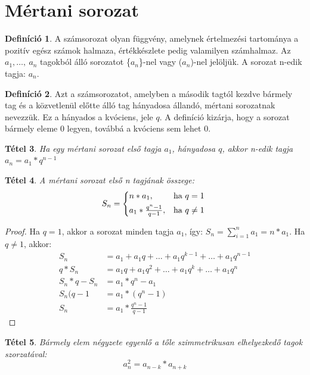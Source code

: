\documentclass[twoside,12pt]{report}
\newtheorem{theorem}{Tétel}[section]
\theoremstyle{definition}
\newtheorem{definition}[theorem]{Definíció}
\begin{document}
\section{Mértani sorozat}
	\begin{definition}
		A számsorozat olyan függvény, amelynek értelmezési tartománya a pozitív egész számok
		halmaza, értékkészlete pedig valamilyen számhalmaz. Az $a_1,\dots,\ a_n$ tagokból álló sorozatot \{$a_n$\}-nel vagy ($a_n$)-nel jelöljük. A sorozat n-edik tagja: $a_n$.
	\end{definition}
	\begin{definition}
		Azt a számsorozatot, amelyben a második tagtól kezdve bármely tag és a közvetlenül
		előtte álló tag hányadosa állandó, mértani sorozatnak nevezzük. Ez a hányados a kvóciens,
		jele $q$. A definíció kizárja, hogy a sorozat bármely eleme 0 legyen, továbbá a kvóciens sem lehet 0.
	\end{definition}
	\begin{theorem}
		Ha egy mértani sorozat első tagja $a_1$, hányadosa $q$, akkor n-edik tagja $a_n=a_1*q^{n-1}$
	\end{theorem}
	\begin{theorem}
		A mértani sorozat első n tagjának összege:
			\begin{equation*}
			S_n=
			\begin{cases*}
			n*a_1,& ha $q=1$\\
			a_1*\frac{q^n-1}{q-1},& ha $q\neq 1$
			\end{cases*}
		\end{equation*}
	\end{theorem}
	\begin{proof}
		Ha $q=1$, akkor a sorozat minden tagja $a_1$, így: $S_n=\sum_{i=1}^{n} a_1=n*a_1$. Ha $q\ne1$, akkor:
		\begin{align*}
			S_n&=a_1+a_1q+\dots+a_1q^{k-1}+\dots+a_1q^{n-1}\\
			q*S_n&=a_1q+a_1q^2+\dots+a_1q^{k}+\dots+a_1q^n\\
			S_n*q-S_n&=a_1*q^n-a_1\tag{Két egyenletet kivonva egymásból}\\
			S_n(q-1&=a_1*(q^n-1)\\
			S_n&=a_1*\frac{q^n-1}{q-1}\tag{Mindkét oldal osztva $q-1\ne0$-val}
		\end{align*}
	\end{proof}
	\begin{theorem}
		Bármely elem négyzete egyenlő a tőle szimmetrikusan elhelyezkedő tagok szorzatával:
		\begin{equation*}
			a_n^2=a_{n-k}*a_{n+k}
		\end{equation*}
	\end{theorem}
\end{document}
